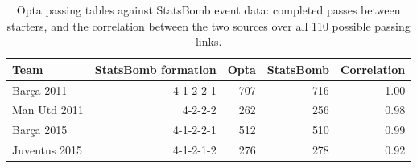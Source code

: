 \begin{table}[t]
\centering\small
\caption{Opta passing tables against StatsBomb event data: completed passes between starters, and the correlation between the two sources over all 110 possible passing links.}
\label{tab:sbcheck}
\begin{tabular}{lrrrr}
\toprule
Team & StatsBomb formation & Opta & StatsBomb & Correlation \\
\midrule
Barça 2011 & 4-1-2-2-1 & 707 & 716 & 1.00 \\
Man Utd 2011 & 4-2-2-2 & 262 & 256 & 0.98 \\
Barça 2015 & 4-1-2-2-1 & 512 & 510 & 0.99 \\
Juventus 2015 & 4-1-2-1-2 & 276 & 278 & 0.92 \\
\bottomrule
\end{tabular}
\end{table}

